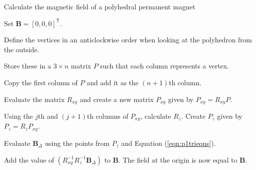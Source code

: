 \begin{algorithm}
	\caption{Calculate the magnetic field of a polyhedral permanent magnet}
	\begin{algorithmic}[1]
		\State Set \(\mathbf{B} = [0,0,0]^\textsf{T}\).
		\State \parbox[t]{\dimexpr\linewidth-\leftmargin-\labelsep-\labelwidth}{Define the vertices in an anticlockwise order when looking at the polyhedron from the outside.}\newline
		\State \parbox[t]{\dimexpr\linewidth-\leftmargin-\labelsep-\labelwidth}{Store these in a \(3\times n\) matrix \(P\) such that each column represents a vertex.}\newline
		\State \parbox[t]{\dimexpr\linewidth-\leftmargin-\labelsep-\labelwidth}{Copy the first column of \(P\) and add it as the \(\left(n+1\right)\)th column.}\newline
		\State \parbox[t]{\dimexpr\linewidth-\leftmargin-\labelsep-\labelwidth}{Evaluate the matrix \(R_{xy}\) and create a new matrix \(P_{xy}\) given by \(P_{xy} = R_{xy}P\).}\newline
		\State \parbox[t]{\dimexpr\linewidth-\leftmargin-\labelsep-\labelwidth}{Using the \(j\)th and \(\left(j+1\right)\)th columns of \(P_{xy}\), calculate \(R_z\). Create \(P_z\) given by \(P_z = R_zP_{xy}\).}\newline
		\State \parbox[t]{\dimexpr\linewidth-\leftmargin-\labelsep-\labelwidth}{Evaluate \(\textbf{B}_\Delta\) using the points from \(P_z\) and Equation (\ref{eqn:p1trieqns}).}\newline
		\State \label{alg:p1enum2}Add the value of \(\left(R_{xy}^{-1}R_z^{-1}\textbf{B}_\Delta\right)\) to \(\mathbf{B}\).
		\EndFor
		\EndFor
		\State The field at the origin is now equal to \(\mathbf{B}\).
	\end{algorithmic}\label{alg:p1alg1}
\end{algorithm}

